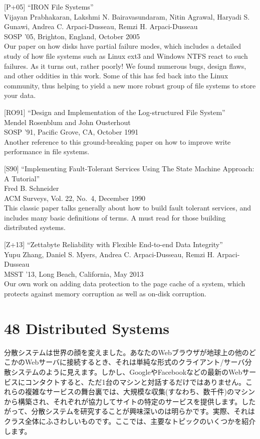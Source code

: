 {[}P+05{]} ``IRON File Systems''\\
Vijayan Prabhakaran, Lakshmi N. Bairavasundaram, Nitin Agrawal, Haryadi
S. Gunawi, Andrea C. Arpaci-Dusseau, Remzi H. Arpaci-Dusseau\\
SOSP '05, Brighton, England, October 2005\\
Our paper on how disks have partial failure modes, which includes a
detailed study of how file systems such as Linux ext3 and Windows NTFS
react to such failures. As it turns out, rather poorly! We found
numerous bugs, design flaws, and other oddities in this work. Some of
this has fed back into the Linux community, thus helping to yield a new
more robust group of file systems to store your data.

{[}RO91{]} ``Design and Implementation of the Log-structured File
System''\\
Mendel Rosenblum and John Ousterhout\\
SOSP '91, Pacific Grove, CA, October 1991\\
Another reference to this ground-breaking paper on how to improve write
performance in file systems.

{[}S90{]} ``Implementing Fault-Tolerant Services Using The State Machine
Approach: A Tutorial''\\
Fred B. Schneider\\
ACM Surveys, Vol. 22, No.~4, December 1990\\
This classic paper talks generally about how to build fault tolerant
services, and includes many basic definitions of terms. A must read for
those building distributed systems.

{[}Z+13{]} ``Zettabyte Reliability with Flexible End-to-end Data
Integrity''\\
Yupu Zhang, Daniel S. Myers, Andrea C. Arpaci-Dusseau, Remzi H.
Arpaci-Dusseau\\
MSST '13, Long Beach, California, May 2013\\
Our own work on adding data protection to the page cache of a system,
which protects against memory corruption as well as on-disk corruption.

\newpage

\hypertarget{distributed-systems}{%
\section*{48 Distributed Systems}\label{distributed-systems}}

分散システムは世界の顔を変えました。あなたのWebブラウザが地球上の他のどこかのWebサーバに接続するとき、それは単純な形式のクライアント/サーバ分散システムのように見えます。しかし、GoogleやFacebookなどの最新のWebサービスにコンタクトすると、ただ1台のマシンと対話するだけではありません。これらの複雑なサービスの舞台裏では、大規模な収集(すなわち、数千件)のマシンから構築され、それぞれが協力してサイトの特定のサービスを提供します。したがって、分散システムを研究することが興味深いのは明らかです。実際、それはクラス全体にふさわしいものです。ここでは、主要なトピックのいくつかを紹介します。

